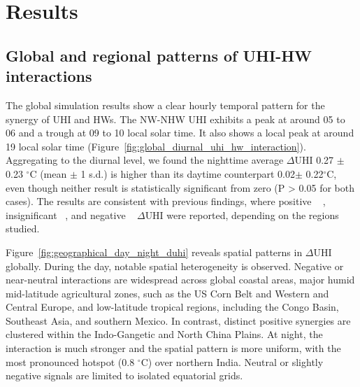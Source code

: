 \section*{Results}

\bgroup
{}
\begin{figure*}[!htbp]
\centering \makeatletter{}
\makeatother 
\caption{{\textbf{Diurnal composite of UHI and HW interaction for all global cities.} The solid line represents the mean, and the shaded area represents +- one standard deviation.}}
\label{fig:global_diurnal_uhi_hw_interaction}
\end{figure*}
\egroup




\subsection*{Global and regional patterns of UHI-HW interactions }The global simulation results show a clear hourly temporal pattern for the synergy of UHI and HWs. The NW-NHW UHI exhibits a peak at around 05 to 06 and a trough at 09 to 10 local solar time. It also shows a local peak at around 19 local solar time (Figure~\ref{fig:global_diurnal_uhi_hw_interaction}). Aggregating to the diurnal level, we found the nighttime average  \ensuremath{\Delta }UHI 0.27 \ensuremath{\pm} 0.23 \ensuremath{^\circ}C (mean \ensuremath{\pm} 1 s.d.) is higher than its daytime counterpart 0.02\ensuremath{\pm} 0.22\ensuremath{^\circ}C, even though neither result is statistically significant from zero (P {\textgreater} 0.05 for both cases). The results are consistent with previous findings, where positive \unskip~\cite{2755510:33598935,2755510:33598909,2755510:33598908,2755510:33598952} , insignificant\unskip~\cite{2755510:33598915} , and negative \unskip~\cite{2755510:33598943,2755510:33598907,2755510:33598905,2755510:33598896}  \ensuremath{\Delta }UHI were reported, depending on the regions studied.

Figure~\ref{fig:geographical_day_night_duhi} reveals spatial patterns in \ensuremath{\Delta }UHI globally. During the day, notable spatial heterogeneity is observed. Negative or near-neutral interactions are widespread across global coastal areas, major humid mid-latitude agricultural zones, such as the US Corn Belt and Western and Central Europe, and low-latitude tropical regions, including the Congo Basin, Southeast Asia, and southern Mexico. In contrast, distinct positive synergies are clustered within the Indo-Gangetic and North China Plains. At night, the interaction is much stronger and the spatial pattern is more uniform, with the most pronounced hotspot (0.8 \ensuremath{^\circ}C) over northern India. Neutral or slightly negative signals are limited to isolated equatorial grids.


